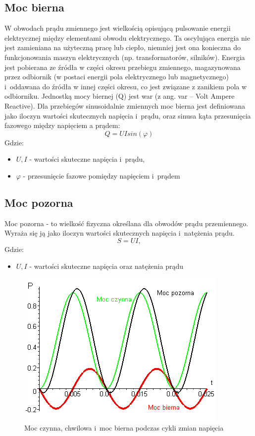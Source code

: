 \documentclass[12pt]{article}
\begin{document}
\subsection{Moc bierna}
W obwodach prądu zmiennego jest wielkością opisującą pulsowanie energii elektrycznej między elementami obwodu elektrycznego. Ta oscylująca energia nie jest zamieniana na użyteczną pracę lub ciepło, niemniej jest ona konieczna do funkcjonowania maszyn elektrycznych (np. transformatorów, silników). Energia jest pobierana ze źródła w części okresu przebiegu zmiennego, magazynowana przez odbiornik (w postaci energii pola elektrycznego lub magnetycznego) i~oddawana do źródła w innej części okresu, co jest związane z zanikiem pola w odbiorniku. Jednostką mocy biernej (Q) jest war (z ang. var – Volt Ampere Reactive).
Dla przebiegów sinusoidalnie zmiennych moc bierna jest definiowana jako iloczyn wartości skutecznych napięcia i~prądu, oraz sinusa kąta przesunięcia fazowego między napięciem a prądem:
\begin{equation}
    Q = UIsin(\varphi)
\end{equation}
Gdzie:
\begin{itemize}[noitemsep]
    \item $U, I$ - wartości skuteczne napięcia i~prądu,
    \item $\varphi$ - przesunięcie fazowe pomiędzy napięciem i~prądem
\end{itemize}
\subsection{Moc pozorna}
Moc pozorna - to wielkość fizyczna określana dla obwodów prądu przemiennego. Wyraża się ją jako iloczyn wartości skutecznych napięcia i~natężenia prądu.
\begin{equation}
    S = UI,
\end{equation}
Gdzie:
\begin{itemize}[noitemsep]
    \item $U, I$ - wartości skuteczne napięcia oraz natężenia prądu
\end{itemize}
\begin{figure}[H]
    \centering
    \includegraphics[scale=0.5]{power_types.png}
    \caption{Moc czynna, chwilowa i~moc bierna podczas cykli zmian napięcia}
    \label{fig:my_label}
\end{figure}
\end{document}
